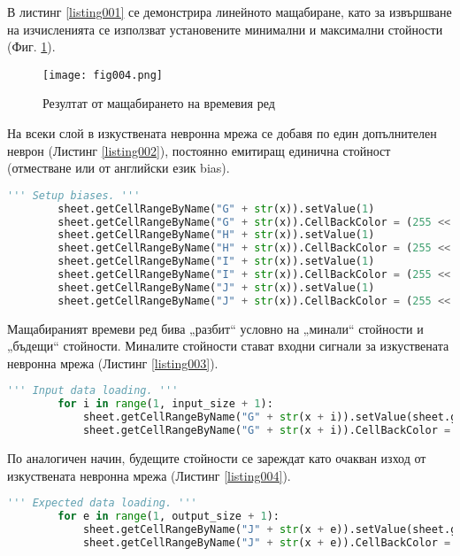 В листинг \ref{listing001} се демонстрира линейното мащабиране, като за извършване на изчисленията се използват установените минимални и максимални стойности (Фиг. \ref{fig004}). 

\begin{figure}[h]
  \centering
  \texttt{[image: fig004.png]}
  \caption{Резултат от мащабирането на времевия ред}
\label{fig004}
\end{figure}

На всеки слой в изкуствената невронна мрежа се добавя по един допълнителен неврон (Листинг \ref{listing002}), постоянно емитиращ единична стойност (отместване или от английски език bias).

\begin{lstlisting}[caption=Неврони емитиращи постоянно единичен сигнал, language=Python, basicstyle=\tiny, label=listing002]
        ''' Setup biases. '''
        sheet.getCellRangeByName("G" + str(x)).setValue(1)
        sheet.getCellRangeByName("G" + str(x)).CellBackColor = (255 << 16 | 255 << 8 | 0)
        sheet.getCellRangeByName("H" + str(x)).setValue(1)
        sheet.getCellRangeByName("H" + str(x)).CellBackColor = (255 << 16 | 255 << 8 | 0)
        sheet.getCellRangeByName("I" + str(x)).setValue(1)
        sheet.getCellRangeByName("I" + str(x)).CellBackColor = (255 << 16 | 255 << 8 | 0)
        sheet.getCellRangeByName("J" + str(x)).setValue(1)
        sheet.getCellRangeByName("J" + str(x)).CellBackColor = (255 << 16 | 255 << 8 | 0)
\end{lstlisting}

Мащабираният времеви ред бива „разбит“ условно на „минали“ стойности и „бъдещи“ стойности. Миналите стойности стават входни сигнали за изкуствената невронна мрежа (Листинг \ref{listing003}).

\begin{lstlisting}[caption=Формиране на входния слой, language=Python, basicstyle=\tiny, label=listing003]
        ''' Input data loading. '''
        for i in range(1, input_size + 1):
            sheet.getCellRangeByName("G" + str(x + i)).setValue(sheet.getCellRangeByName("E" + str(t + i)).getValue())
            sheet.getCellRangeByName("G" + str(x + i)).CellBackColor = (255 << 16 | 0 << 8 | 0)
\end{lstlisting}

По аналогичен начин, будещите стойности се зареждат като очакван изход от изкуствената невронна мрежа (Листинг \ref{listing004}).

\begin{lstlisting}[caption=Очакван изход от мрежата, language=Python, basicstyle=\tiny, label=listing004]
        ''' Expected data loading. '''
        for e in range(1, output_size + 1):
            sheet.getCellRangeByName("J" + str(x + e)).setValue(sheet.getCellRangeByName("E" + str(t + e + input_size)).getValue())
            sheet.getCellRangeByName("J" + str(x + e)).CellBackColor = (0 << 16 | 127 << 8 | 0)
\end{lstlisting}

